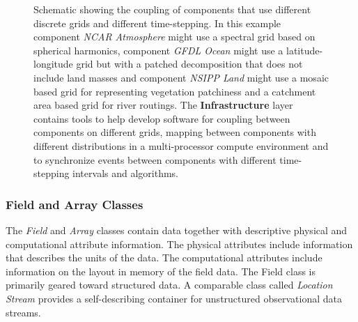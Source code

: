 \begin{figure}
\caption{Schematic showing the coupling of components that use different discrete grids and different time-stepping. 
In this example component {\it NCAR Atmosphere} might use a spectral grid based on spherical harmonics, component
{\it GFDL Ocean} might use a latitude-longitude grid but with a patched decomposition that does not include
land masses and component {\it NSIPP Land} might use a mosaic based grid for representing vegetation patchiness
and a catchment area based grid for river routings. The {\bf Infrastructure} layer contains tools to help develop 
software for coupling between components on different grids, mapping between components with different distributions in a 
multi-processor compute environment and to synchronize events between components with different time-stepping intervals 
and algorithms.  }
\label{fig:threecomponents}
\end{figure}

\subsubsection{Field and Array Classes}
The {\it Field} and {\it Array} classes contain data together with descriptive
physical and computational attribute information. The physical attributes include information that describes the units
of the data. The computational attributes include information on the layout in memory of the field data. The Field class
is primarily geared toward structured data. A comparable class called {\it Location Stream} provides a self-describing
container for unstructured observational data streams.

